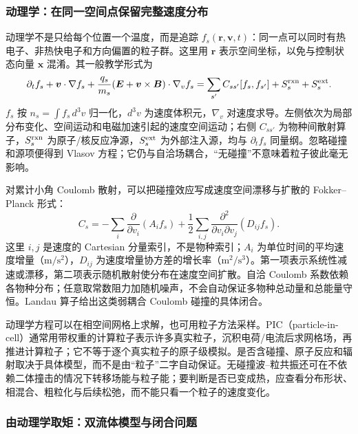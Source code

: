 \documentclass[12pt,fontset=none]{ctexart}
\numberwithin{equation}{section}
\numberwithin{table}{section}
\numberwithin{figure}{section}
\begin{document}
\subsubsection{动理学：在同一空间点保留完整速度分布}

动理学不是只给每个位置一个温度，而是追踪 $f_s(\bm r,\bm v,t)$：同一点可以同时有热电子、非热快电子和方向偏置的粒子群。这里用 $\bm r$ 表示空间坐标，以免与控制状态向量 $\bm x$ 混淆。其一般教学形式为
\begin{equation}\label{eq:micro-kinetic}
 \partial_t f_s+\bm v\cdot\nabla f_s+
 \frac{q_s}{m_s}(\bm E+\bm v\times\bm B)\cdot\nabla_v f_s
 =\sum_{s'}C_{ss'}[f_s,f_{s'}]+S_s^{\rm rxn}+S_s^{\rm ext}.
\end{equation}
$f_s$ 按 $n_s=\int f_s\,d^3v$ 归一化，$d^3v$ 为速度体积元，$\nabla_v$ 对速度求导。左侧依次为局部分布变化、空间运动和电磁加速引起的速度空间运动；右侧 $C_{ss'}$ 为物种间散射算子，$S_s^{\rm rxn}$ 为原子/核反应净源，$S_s^{\rm ext}$ 为外部注入源，均与 $\partial_t f_s$ 同量纲。忽略碰撞和源项便得到 Vlasov 方程；它仍与自洽场耦合，``无碰撞''不意味着粒子彼此毫无影响。

对累计小角 Coulomb 散射，可以把碰撞效应写成速度空间漂移与扩散的 Fokker--Planck 形式：
\begin{equation}\label{eq:micro-fp}
 C_s=-\sum_i\frac{\partial}{\partial v_i}(A_i f_s)
 +\frac12\sum_{i,j}\frac{\partial^2}{\partial v_i\partial v_j}(D_{ij}f_s).
\end{equation}
这里 $i,j$ 是速度的 Cartesian 分量索引，不是物种索引；$A_i$ 为单位时间的平均速度增量（$\mathrm{m/s^2}$），$D_{ij}$ 为速度增量协方差的增长率（$\mathrm{m^2/s^3}$）。第一项表示系统性减速或漂移，第二项表示随机散射使分布在速度空间扩散。自洽 Coulomb 系数依赖各物种分布；任意取常数阻力加随机噪声，不会自动保证多物种总动量和总能量守恒。Landau 算子给出这类弱耦合 Coulomb 碰撞的具体闭合\cite{Plandau}。

动理学方程可以在相空间网格上求解，也可用粒子方法采样。PIC（particle-in-cell）通常用带权重的计算粒子表示许多真实粒子，沉积电荷/电流后求网格场，再推进计算粒子；它不等于逐个真实粒子的原子级模拟。是否含碰撞、原子反应和辐射取决于具体模型，而不是由``粒子''二字自动保证。无碰撞波--粒共振还可在不依赖二体撞击的情况下转移场能与粒子能；要判断是否已变成热，应查看分布形状、相混合、粗粒化与后续松弛，而不能只看一个粒子的速度变化。

\subsubsection{由动理学取矩：双流体模型与闭合问题}
\end{document}
